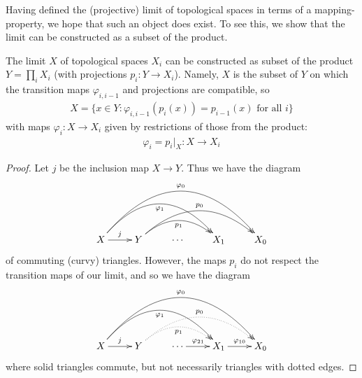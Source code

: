       Having defined the (projective) limit of topological spaces in terms of a mapping-property, we hope that such an object does exist.
      To see this, we show that the limit can be constructed as a subset of the product.
      \begin{claim}
        \label{claim:limitexists}
        The limit $X$ of topological spaces $X_i$ can be constructed as subset of the product $Y=\prod_i X_i$ (with projections $p_i:Y\rightarrow X_i$).
        Namely, $X$ is the subset of $Y$ on which the transition maps $\varphi_{i,i-1}$ and projections are compatible, so
        \begin{align*}
          X = \{x\in Y: \varphi_{i,i-1}(p_i(x)) = p_{i-1}(x) \text{ for all } i\}
        \end{align*}
        with maps $\varphi_i:X\rightarrow X_i$ given by restrictions of those from the product:
        \begin{align*}
          \varphi_i = p_i|_X :X\rightarrow X_i
        \end{align*}
        \begin{proof}
          Let $j$ be the inclusion map $X\rightarrow Y$.
          Thus we have the diagram
          \begin{displaymath}
            \xymatrix{
              X \ar[r]^j \ar@/^37pt/[rrr]_{\varphi_1} \ar@/^50pt/[rrrr]^{\varphi_0}
              & Y \ar@/^20pt/[rr]_{p_1} \ar@/^30pt/[rrr]^{p_0}
              & \cdots
              & X_1
              & X_0
            }
          \end{displaymath}
          of commuting (curvy) triangles.
          However, the maps $p_i$ do not respect the transition maps of our limit, and so we have the diagram
          \begin{displaymath}
            \xymatrix{
              X \ar[r]^j \ar@/^37pt/[rrr]_{\varphi_1} \ar@/^50pt/[rrrr]^{\varphi_0}
              & Y \ar@/^20pt/@{..>}[rr]_{p_1} \ar@/^30pt/@{..>}[rrr]^{p_0}
              & \cdots \ar[r]^{\varphi_{21}}
              & X_1 \ar[r]^{\varphi_{10}}
              & X_0
            }
          \end{displaymath}
          where solid triangles commute, but not necessarily triangles with dotted edges.
          

\end{proof}
\end{claim}
